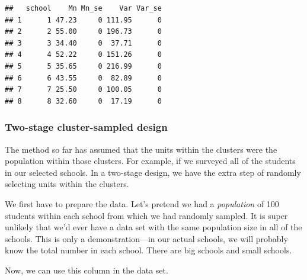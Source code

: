 \documentclass[
]{article}
\newenvironment{Shaded}{\begin{snugshade}}{\end{snugshade}}
\newcommand{\DataTypeTok}[1]{\textcolor[rgb]{0.13,0.29,0.53}{#1}}
\newcommand{\DecValTok}[1]{\textcolor[rgb]{0.00,0.00,0.81}{#1}}
\newcommand{\KeywordTok}[1]{\textcolor[rgb]{0.13,0.29,0.53}{\textbf{#1}}}
\newcommand{\NormalTok}[1]{#1}
\newcommand{\OperatorTok}[1]{\textcolor[rgb]{0.81,0.36,0.00}{\textbf{#1}}}
\newcommand{\StringTok}[1]{\textcolor[rgb]{0.31,0.60,0.02}{#1}}
\begin{document}
\begin{verbatim}
##   school    Mn Mn_se    Var Var_se
## 1      1 47.23     0 111.95      0
## 2      2 55.00     0 196.73      0
## 3      3 34.40     0  37.71      0
## 4      4 52.22     0 151.26      0
## 5      5 35.65     0 216.99      0
## 6      6 43.55     0  82.89      0
## 7      7 25.50     0 100.05      0
## 8      8 32.60     0  17.19      0
\end{verbatim}

\hypertarget{two-stage-cluster-sampled-design}{%
\subsubsection{Two-stage cluster-sampled design}\label{two-stage-cluster-sampled-design}}

The method so far has assumed that the units within the clusters were the population within those clusters. For example, if we surveyed all of the students in our selected schools. In a two-stage design, we have the extra step of randomly selecting units within the clusters.

We first have to prepare the data. Let's pretend we had a \emph{population} of 100 students within each school from which we had randomly sampled. It is super unlikely that we'd ever have a data set with the same population size in all of the schools. This is only a demonstration---in our actual schools, we will probably know the total number in each school. There are big schools and small schools.

\begin{Shaded}
\end{Shaded}

Now, we can use this column in the data set.

\begin{Shaded}
\end{Shaded}
\end{document}
